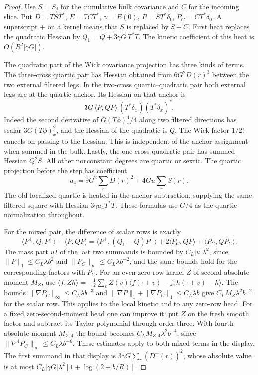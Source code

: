 \documentclass[11pt]{article}
\theoremstyle{definition}
\begin{document}
\begin{proof}
Use \(S=S_j\) for the cumulative bulk covariance and \(C\)
for the incoming slice. Put \(D=TST^*\), \(E=TCT^*\),
\(\gamma=E(0)\), \(P=ST^*\delta_0\), \(P_C=CT^*\delta_0\).
A superscript \(+\) on a kernel means that \(S\) is replaced
by \(S+C\). First heat replaces the quadratic Hessian by
\(Q_1=Q+3\gamma G\,T^*T\). The kinetic coefficient of
this heat is \(O(R^2|\gamma G|)\).

The quadratic part of the Wick covariance projection has
three kinds of terms. The three-cross quartic pair has
Hessian obtained from \(6G^2D(r)^3\) between the two
external filtered legs. In the two-cross quartic--quadratic
pair both external legs are at the quartic anchor. Its
Hessian on that anchor is
\begin{equation}
 3G\,\langle P,Q P\rangle\,
       (T^*\delta_x)(T^*\delta_x)^* .
\end{equation}
Indeed the second derivative of \(G(T\phi)_x^4/4\) along
two filtered directions has scalar \(3G(T\phi)_x^2\),
and the Hessian of the quadratic is \(Q\). The Wick
factor \(1/2!\) cancels on passing to the Hessian. This is
independent of the anchor assignment when summed in the
bulk. Lastly, the one-cross quadratic pair has summed
Hessian \(Q^2 S\). All other nonconstant degrees are
quartic or sextic. The quartic projection before the
step has coefficient
\begin{equation}
 a_4=9G^2\sum_r D(r)^2+4Gu\sum_r S(r).
\end{equation}
The old localized quartic is heated in the anchor
subtraction, supplying the same filtered square with
Hessian \(3\gamma a_4T^*T\). These formulas use \(G/4\)
as the quartic normalization throughout.

For the mixed pair, the difference of scalar rows is
exactly
\begin{equation}
 \langle P^+,Q_1P^+\rangle-\langle P,QP\rangle
 =\langle P^+,(Q_1-Q)P^+\rangle
       +2\langle P_C,QP\rangle+\langle P_C,QP_C\rangle .
\end{equation}
The mass part \(uI\) of the last two summands is
bounded by \(C_L|u|\lambda^2\), since
\(\|P\|_1\le C_L\lambda b^2\) and
\(\|P_C\|_\infty\le C_L\lambda b^{-2}\), and the same
bounds hold for the corresponding factors with \(P_C\).
For an even zero-row kernel \(Z\) of second absolute
moment \(M_Z\), use
\(\langle f,Zh\rangle=-\tfrac12\sum_v Z(v)
 \langle f(\cdot+v)-f,h(\cdot+v)-h\rangle\).
The bounds \(\|\nabla P_C\|_\infty\le C_L\lambda b^{-3}\)
and \(\|\nabla P\|_1+\|\nabla P_C\|_1\le C_L\lambda b\)
give \(C_L M_Z\lambda^2 b^{-2}\) for the scalar row. This
applies to the local kinetic and to any zero-row head.
For a fixed zero-second-moment head one can improve it:
put \(Z\) on the fresh smooth factor and subtract its
Taylor polynomial through order three. With fourth
absolute moment \(M_{Z,4}\) the bound becomes
\(C_L M_{Z,4}\lambda^2 b^{-4}\), since
\(\|\nabla^4P_C\|_\infty\le C_L\lambda b^{-6}\).
These estimates apply to both mixed terms in the display.
The first summand in that display is
\(3\gamma G\sum_r (D^+(r))^2\), whose absolute value is
at most \(C_L|\gamma G|\lambda^2[1+\log(2+b/R)]\).


\end{proof}
\end{document}
